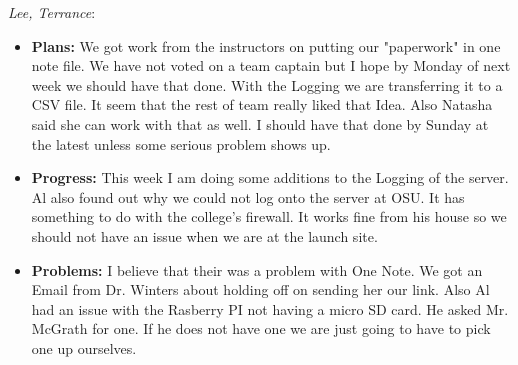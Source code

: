 \documentclass[10pt,draftclsnofoot,onecolumn]{IEEEtran}
\newcommand{\subsubsubsection}[1]{
	\hfill\break\textit{#1}:
}
\begin{document}
\subsubsubsection{Lee, Terrance}
\begin{itemize}
	\item \textbf{Plans: }
	We got work from the instructors on putting our "paperwork" in one note file. We have not voted on a team captain but I hope by Monday of next week we should have that done. With the Logging we are transferring it to a CSV file. It seem that the rest of team really liked that Idea. Also Natasha said she can work with that as well. I should have that done by Sunday at the latest unless some serious problem shows up.
	\item \textbf{Progress: }
	This week I am doing some additions to the Logging of the server. Al also found out why we could not log onto the server at OSU. It has something to do with the college's firewall. It works fine from his house so we should not have an issue when we are at the launch site.
	\item \textbf{Problems: }
	I believe that their was a problem with One Note. We got an Email from Dr. Winters about holding off on sending her our link. Also Al had an issue with the Rasberry PI not having a micro SD card. He asked Mr. McGrath for one. If he does not have one we are just going to have to pick one up ourselves.
\end{itemize}
\end{document}
